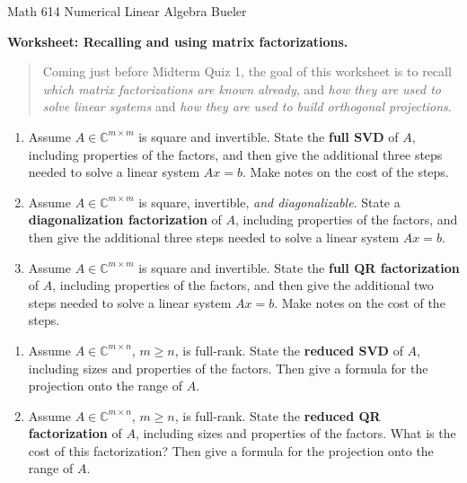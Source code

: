 \documentclass[11pt]{amsart}
\newcommand{\CC}{\mathbb{C}}
\begin{document}
\scriptsize \noindent Math 614 Numerical Linear Algebra \hfill Bueler
\normalsize\medskip

\Large\centerline{\textbf{Worksheet: Recalling and using matrix factorizations.}}
\medskip
\normalsize

\thispagestyle{empty}

\begin{quote}
Coming just before Midterm Quiz 1, the goal of this worksheet is to recall \emph{which matrix factorizations are known already}, and \emph{how they are used to solve linear systems} and \emph{how they are used to build orthogonal projections}.
\end{quote}

\bigskip
\begin{enumerate}[leftmargin=-1mm]
\renewcommand{\labelenumi}{\textbf{\arabic{enumi}.}}
\item Assume $A\in\CC^{m\times m}$ is square and invertible.  State the \textbf{full SVD} of $A$, including properties of the factors, and then give the additional three steps needed to solve a linear system $Ax=b$.  Make notes on the cost of the steps.

\vfill

\item Assume $A\in\CC^{m\times m}$ is square, invertible, \emph{and diagonalizable}.  State a \textbf{diagonalization factorization} of $A$, including properties of the factors, and then give the additional three steps needed to solve a linear system $Ax=b$.

\vfill

\clearpage\newpage
\item Assume $A\in\CC^{m\times m}$ is square and invertible.  State the \textbf{full QR factorization} of $A$, including properties of the factors, and then give the additional two steps needed to solve a linear system $Ax=b$.  Make notes on the cost of the steps.

\vfill

\end{enumerate}

\noindent\hrulefill

\medskip
\begin{enumerate}[leftmargin=-1mm]
\renewcommand{\labelenumi}{\textbf{\Alph{enumi}.}}
\item Assume $A\in\CC^{m\times n}$, $m\ge n$, is full-rank.  State the \textbf{reduced SVD} of $A$, including sizes and properties of the factors.  Then give a formula for the projection onto the range of $A$.

\vfill

\item Assume $A\in\CC^{m\times n}$, $m\ge n$, is full-rank.  State the \textbf{reduced QR factorization} of $A$, including sizes and properties of the factors.  What is the cost of this factorization?  Then give a formula for the projection onto the range of $A$.

\vfill

\end{enumerate}
\end{document}
